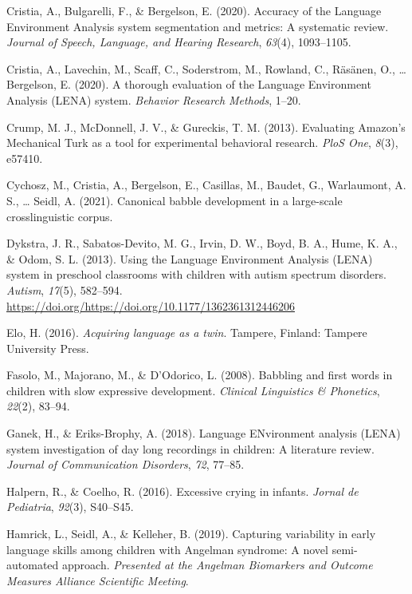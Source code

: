 \documentclass[english,,man]{apa6}
\begin{document}
\leavevmode\hypertarget{ref-cristia2020accuracy}{}%
Cristia, A., Bulgarelli, F., \& Bergelson, E. (2020). Accuracy of the Language Environment Analysis system segmentation and metrics: A systematic review. \emph{Journal of Speech, Language, and Hearing Research}, \emph{63}(4), 1093--1105.

\leavevmode\hypertarget{ref-cristia2020thorough}{}%
Cristia, A., Lavechin, M., Scaff, C., Soderstrom, M., Rowland, C., Räsänen, O., \ldots{} Bergelson, E. (2020). A thorough evaluation of the Language Environment Analysis (LENA) system. \emph{Behavior Research Methods}, 1--20.

\leavevmode\hypertarget{ref-crump2013evaluating}{}%
Crump, M. J., McDonnell, J. V., \& Gureckis, T. M. (2013). Evaluating Amazon's Mechanical Turk as a tool for experimental behavioral research. \emph{PloS One}, \emph{8}(3), e57410.

\leavevmode\hypertarget{ref-cychosz2021canonical}{}%
Cychosz, M., Cristia, A., Bergelson, E., Casillas, M., Baudet, G., Warlaumont, A. S., \ldots{} Seidl, A. (2021). Canonical babble development in a large-scale crosslinguistic corpus.

\leavevmode\hypertarget{ref-Dykstra2013}{}%
Dykstra, J. R., Sabatos-Devito, M. G., Irvin, D. W., Boyd, B. A., Hume, K. A., \& Odom, S. L. (2013). Using the Language Environment Analysis (LENA) system in preschool classrooms with children with autism spectrum disorders. \emph{Autism}, \emph{17}(5), 582--594. \url{https://doi.org/https://doi.org/10.1177/1362361312446206}

\leavevmode\hypertarget{ref-Elo}{}%
Elo, H. (2016). \emph{Acquiring language as a twin}. Tampere, Finland: Tampere University Press.

\leavevmode\hypertarget{ref-fasolo2008babbling}{}%
Fasolo, M., Majorano, M., \& D'Odorico, L. (2008). Babbling and first words in children with slow expressive development. \emph{Clinical Linguistics \& Phonetics}, \emph{22}(2), 83--94.

\leavevmode\hypertarget{ref-ganek2018language}{}%
Ganek, H., \& Eriks-Brophy, A. (2018). Language ENvironment analysis (LENA) system investigation of day long recordings in children: A literature review. \emph{Journal of Communication Disorders}, \emph{72}, 77--85.

\leavevmode\hypertarget{ref-halpern2016excessive}{}%
Halpern, R., \& Coelho, R. (2016). Excessive crying in infants. \emph{Jornal de Pediatria}, \emph{92}(3), S40--S45.

\leavevmode\hypertarget{ref-hamrick2019capturing}{}%
Hamrick, L., Seidl, A., \& Kelleher, B. (2019). Capturing variability in early language skills among children with Angelman syndrome: A novel semi-automated approach. \emph{Presented at the Angelman Biomarkers and Outcome Measures Alliance Scientific Meeting}.
\end{document}
